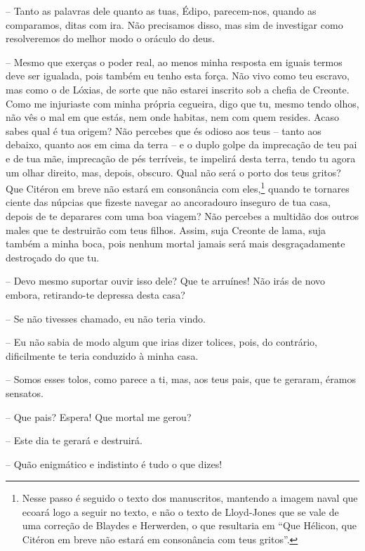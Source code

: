  --   Tanto as palavras dele quanto as tuas, Édipo, parecem-nos, quando as
comparamos, ditas com ira. Não precisamos disso, mas sim de investigar
como resolveremos do melhor modo o oráculo do deus.

 --   Mesmo que exerças o poder real, ao menos minha resposta em iguais termos
 deve ser igualada, pois também eu tenho esta força. Não vivo como
teu escravo, mas como o de Lóxias, de sorte que não estarei inscrito sob
a chefia de Creonte. Como me injuriaste com minha própria cegueira, digo
que tu, mesmo tendo olhos, não vês o mal em que estás, nem onde habitas,
nem com quem resides. Acaso sabes qual é tua origem? Não percebes que és
odioso aos teus -- tanto aos debaixo, quanto aos em cima da terra -- e o
duplo golpe da imprecação de teu pai e de tua mãe, imprecação de pés
terríveis, te impelirá desta terra, tendo tu agora um olhar direito,
mas, depois, obscuro.  Qual não será o porto dos teus gritos? Que
Citéron em breve não estará em consonância com eles,\footnote{Nesse passo
  é seguido o texto dos manuscritos, mantendo a imagem naval que ecoará
  logo a seguir no texto, e não o texto de Lloyd-Jones que se vale de
  uma correção de Blaydes e Herwerden, o que resultaria em ``Que
  Hélicon, que Citéron em breve não estará em consonância com teus
  gritos''.} quando te tornares ciente das núpcias que fizeste navegar
ao ancoradouro inseguro de tua casa, depois de te deparares com uma boa
viagem? Não percebes a multidão dos outros males que te destruirão com
teus filhos. Assim, suja Creonte de lama, suja também a minha boca, pois
nenhum mortal jamais será mais desgraçadamente destroçado do que tu.

 --    Devo mesmo suportar ouvir isso dele? Que te arruínes! Não irás de
novo embora, retirando-te depressa desta casa?

 --   Se não tivesses chamado, eu não teria vindo.

 --   Eu não sabia de modo algum que irias dizer tolices, pois, do contrário,
dificilmente te teria conduzido à minha casa.

 --   Somos esses tolos, como parece a ti, mas, aos teus pais, que te geraram,
éramos sensatos.

 --   Que pais? Espera! Que mortal me gerou?

 --   Este dia te gerará e destruirá.

 --   Quão enigmático e indistinto é tudo o que dizes!

